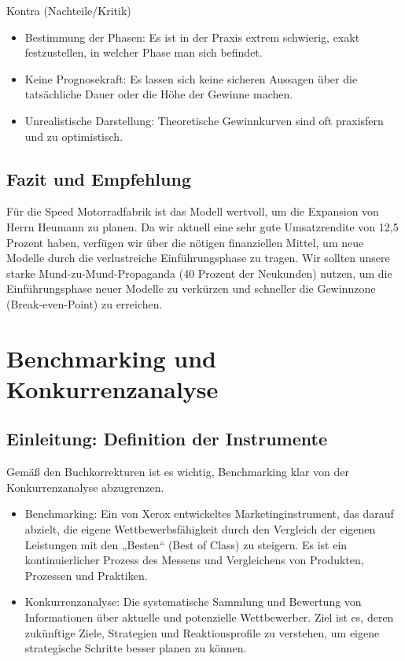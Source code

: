 \documentclass[12pt, a4paper]{article}
\begin{document}
Kontra (Nachteile/Kritik) \newline
\begin{itemize}
    \item Bestimmung der Phasen: Es ist in der Praxis extrem schwierig, exakt festzustellen, in welcher Phase man sich befindet.
    \item Keine Prognosekraft: Es lassen sich keine sicheren Aussagen über die tatsächliche Dauer oder die Höhe der Gewinne machen.
    \item Unrealistische Darstellung: Theoretische Gewinnkurven sind oft praxisfern und zu optimistisch.
\end{itemize}

\subsection{Fazit und Empfehlung}
Für die Speed Motorradfabrik ist das Modell wertvoll, um die Expansion von Herrn Heumann zu planen. 
Da wir aktuell eine sehr gute Umsatzrendite von 12,5 Prozent haben, verfügen wir über die nötigen finanziellen 
Mittel, um neue Modelle durch die verlustreiche Einführungsphase zu tragen. Wir sollten unsere starke 
Mund-zu-Mund-Propaganda (40 Prozent der Neukunden) nutzen, um die Einführungsphase neuer Modelle zu verkürzen 
und schneller die Gewinnzone (Break-even-Point) zu erreichen.
\newpage

\section{Benchmarking und Konkurrenzanalyse}
\subsection{Einleitung: Definition der Instrumente}
Gemäß den Buchkorrekturen ist es wichtig, Benchmarking klar von der Konkurrenzanalyse abzugrenzen.
\begin{itemize}
    \item Benchmarking: Ein von Xerox entwickeltes Marketinginstrument, das darauf abzielt, die eigene Wettbewerbsfähigkeit durch den Vergleich der eigenen Leistungen mit den „Besten“ (Best of Class) zu steigern. Es ist ein kontinuierlicher Prozess des Messens und Vergleichens von Produkten, Prozessen und Praktiken.
    \item Konkurrenzanalyse: Die systematische Sammlung und Bewertung von Informationen über aktuelle und potenzielle Wettbewerber. Ziel ist es, deren zukünftige Ziele, Strategien und Reaktionsprofile zu verstehen, um eigene strategische Schritte besser planen zu können.
\end{itemize}
\end{document}
